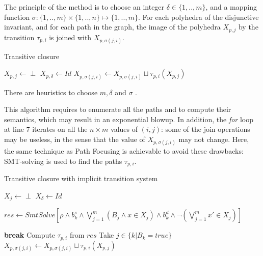 \documentclass[a4paper,english,titlepage,11pt]{report}
\begin{document}
	The principle of the method is to
	choose an integer $\delta \in \{1,..,m\}$, and a mapping function
	$\sigma: \{1,..,m\} \times \{1,..,n\} \mapsto \{1,..,m\}$.
	For each polyhedra of the disjunctive invariant, and for each path in the
	graph, the image of the polyhedra $X_{p,j}$ by the transition
	$\tau_{p,i}$ is joined with $X_{p,\sigma(j,i)}$.

\begin{algorithm}
\caption{Transitive closure}\label{gulwani}
\begin{algorithmic}[1] 
	\State $X_{p,j} \gets \perp$
\EndFor
\State $X_{p,\delta} \gets Id$
\Repeat
		\State $X_{p,\sigma(j,i)} \gets X_{p,\sigma(j,i)} \sqcup
		\tau_{p,i}(X_{p,j})$
	\EndFor
{}
\EndProcedure
\end{algorithmic}
\end{algorithm}

There are heuristics to choose $m,\delta$ and $\sigma$ \cite[Section
5]{GulwaniZ10}.

This algorithm requires to enumerate all the paths and to compute their
semantics, which may result in an exponential blowup. In addition, the
\emph{for} loop at line $7$ iterates on all the $n \times m$ values of $(i,j)$:
some of the join operations may be useless, in the sense that the value of 
$X_{p,\sigma(j,i)}$ may not change. Here, the same technique as
Path Focusing is achievable to avoid these drawbacks:  SMT-solving is used
to find the paths $\tau_{p,i}$.

\begin{algorithm}[!h]
\caption{Transitive closure with implicit transition system}\label{gulwani2}
\begin{algorithmic}[1] 
	\State $X_{j} \gets \perp$
\EndFor
\State $X_{\delta} \gets Id$

		\State $res \gets SmtSolve\left[\rho \wedge b_k^s \wedge
		\bigvee_{j=1}^m (B_j \wedge x \in X_{j})
		\wedge b_k^d
		\wedge \neg \left(\bigvee_{j=1}^m x' \in X_{j}\right)\right]$

		\State \textbf{break}
	\EndIf
	\State Compute $\tau_{p,i}$ from $res$ 
	\State Take $j \in \{ k | B_k = true\}$ 
	\State $X_{p,\sigma(j,i)} \gets X_{p,\sigma(j,i)} \sqcup
	\tau_{p,i}(X_{p,j})$
\EndWhile
\EndProcedure
\end{algorithmic}
\end{algorithm}
\end{document}

